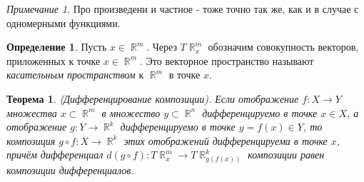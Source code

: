 \documentclass[a4paper,100pt]{article}
\theoremstyle{indented}
\newtheorem{theorem}{Теорема}
\theoremstyle{definition}
\newtheorem{defn}{Определение}
\theoremstyle{remark}
\newtheorem{remark}{Примечание}
\DeclareMathOperator{\RR}{\mathbb{R}}
\begin{document}
\begin{remark}
    Про произведени и частное - тоже точно так же, как и в случае с одномерными функциями.
\end{remark}

\begin{defn}
    Пусть $x\in \RR^m$. Через $T\RR_x^m$ обозначим совокупность векторов, приложенных к точке $x\in \RR^m$. Это векторное пространство называют \textit{касательным пространством} к $\RR^m$ в точке $x$. 
\end{defn}

\begin{theorem}
    (Дифференцирование композиции). Если отображение $f: X \rightarrow Y$ множества $x\subset \RR^m$ в множество $y\subset \RR^n$ дифференцируемо в точке $x\in X$, а отображение $g: Y \rightarrow \RR^k$ дифференцируемо в точке $y=f(x)\in Y$, то композиция $g\circ f: X \rightarrow \RR^k$ этих отображений дифференцируема в точке $x$, причём дифференциал $d(g\circ f): T\RR_x^m \rightarrow T\RR_{g(f(x))}^k$ композиции равен композиции дифференциалов.
\end{theorem}
\end{document}
